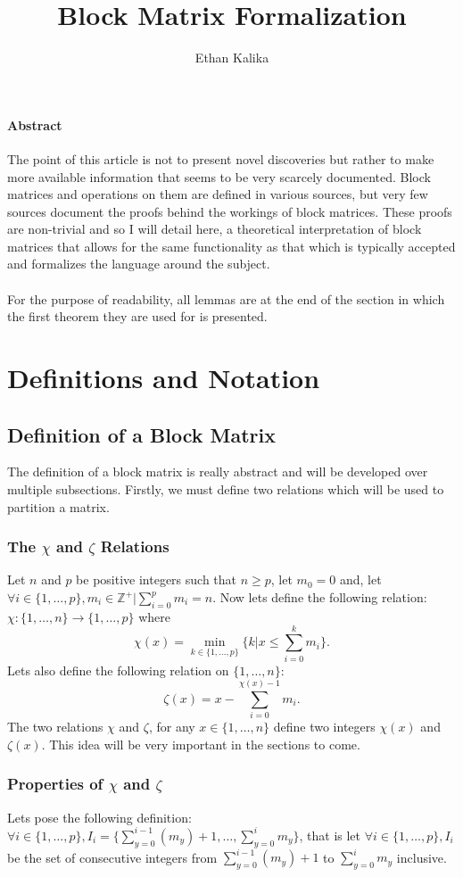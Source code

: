 \documentclass{article}
\title{Block Matrix Formalization}
\author{Ethan Kalika}
\begin{document}
\maketitle
\paragraph{Abstract}
The point of this article is not to present novel discoveries but rather to make more available information that seems to be very scarcely documented. Block matrices and operations on them are defined in various sources, but very few sources document the proofs behind the workings of block matrices. These proofs are non-trivial and so I will detail here, a theoretical interpretation of block matrices that allows for the same functionality as that which is typically accepted and formalizes the language around the subject.\\\\
For the purpose of readability, all lemmas are at the end of the section in which the first theorem they are used for is presented. 
\section{Definitions and Notation}
\subsection{Definition of a Block Matrix}
The definition of a block matrix is really abstract and will be developed over multiple subsections. Firstly, we must define two relations which will be used to partition a matrix.
\subsubsection{The $\chi$ and $\zeta$ Relations}
Let $n$ and $p$ be positive integers such that $n \geq p$, let $m_0 = 0$ and, let $\forall i \in \{1, \ldots, p\}, m_i \in \mathbb{Z}^+ | \sum_{i = 0}^pm_i = n$. Now lets define the following relation: $\chi : \{1, \ldots, n\} \rightarrow \{1, \ldots, p\}$ where
$$\chi(x) = \min\limits_{k \in \{1, \ldots, p\}}\{k | x \leq \sum_{i = 0}^km_i\}.$$
Lets also define the following relation on $\{1, \ldots, n\}$: $$\zeta(x) = x - \sum_{i = 0}^{\chi(x) - 1}m_i.$$
The two relations $\chi$ and $\zeta$, for any $x \in \{1, \ldots, n\}$ define two integers $\chi(x)$ and $\zeta(x)$. This idea will be very important in the sections to come.
\subsubsection{Properties of $\chi$ and $\zeta$}
Lets pose the following definition: $\forall i \in \{1, \ldots, p\}, I_i = \{\sum_{y = 0}^{i - 1}(m_y) + 1, \ldots, \sum_{y = 0}^{i}m_y\}$, that is let $\forall i \in \{1, \ldots, p\}, I_i$ be the set of consecutive integers from $\sum_{y = 0}^{i - 1}(m_y) + 1$ to $\sum_{y = 0}^{i}m_y$ inclusive.
\end{document}
